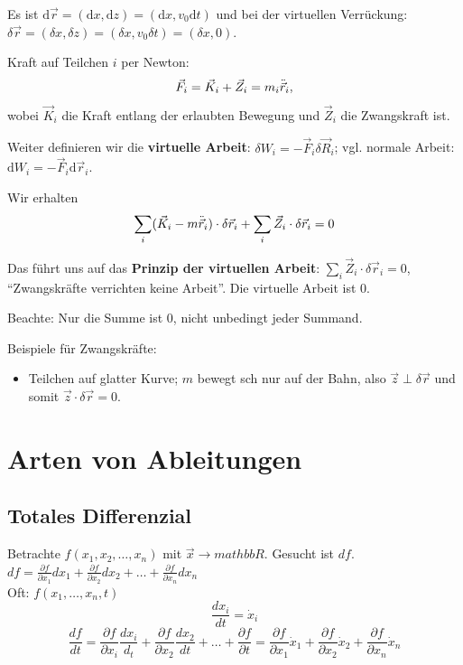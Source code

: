 Es ist $\mathrm{d} \vec{r} = (\mathrm{d} x, \mathrm{d} z) = (\mathrm{d} x, v_0 \mathrm{d} t)$ und bei der virtuellen Verrückung: $\delta \vec{r} = (\delta x, \delta z) = (\delta x, v_0 \delta t) = (\delta x, 0)$.

Kraft auf Teilchen $i$ per Newton: 
\[
	\vec{F}_i = \vec{K}_i + \vec{Z}_i = m_i \ddot{\vec{r}}_i,
\]
wobei $\vec{K}_i$ die Kraft entlang der erlaubten Bewegung und $\vec{Z}_i$ die Zwangskraft ist.

Weiter definieren wir die \textbf{virtuelle Arbeit}: $\delta W_i = - \vec{F}_i \delta \vec{R}_i$; vgl. normale Arbeit: $\mathrm{d} W_i = -\vec{F}_i \mathrm{d} \vec{r}_i$.

Wir erhalten
\[
	\sum_i (\vec{K}_i - m \ddot{\vec{r}}_i) \cdot \delta \vec{r}_i + \sum_i \vec{Z}_i \cdot \delta \vec{r}_i = 0
\]

Das führt uns auf das \textbf{Prinzip der virtuellen Arbeit}: $\sum_i \vec{Z}_i \cdot \delta \vec{r}_i = 0$, "`Zwangskräfte verrichten keine Arbeit"'. Die virtuelle Arbeit ist 0.

Beachte: Nur die Summe ist $0$, nicht unbedingt jeder Summand.

Beispiele für Zwangskräfte: 
\begin{itemize}
	\item Teilchen auf glatter Kurve; $m$ bewegt sch nur auf der Bahn, also $\vec{z} \perp \delta \vec{r}$ und somit $\vec{z} \cdot \delta \vec{r} = 0$.
\end{itemize}

\section{Arten von Ableitungen}
\subsection{Totales Differenzial}
Betrachte $f(x_1, x_2, \ldots, x_n)$ mit $\vec x \rightarrow mathbb{R}$. Gesucht ist $df$.\\

$df = \frac{\partial f}{\partial x_1} dx_1 + \frac{\partial f}{\partial x_2} dx_2 + \ldots + \frac{\partial f}{\partial x_n} dx_n$\\

Oft: $f(x_1, \ldots, x_n, t)$
\[ \frac{dx_i}{dt} = \dot x_i \]
\[ \frac{df}{dt} = \frac{\partial f}{\partial x_i} \frac{d x_i}{d_t} + \frac{\partial f}{\partial x_2} \frac{d x_2}{d t} + \ldots + \frac{\partial f}{\partial t} = \frac{\partial f}{\partial x_1} \dot x_1 + \frac{\partial f}{\partial x_2} \dot x_2 + \frac{\partial f}{\partial x_n} \dot x_n \]